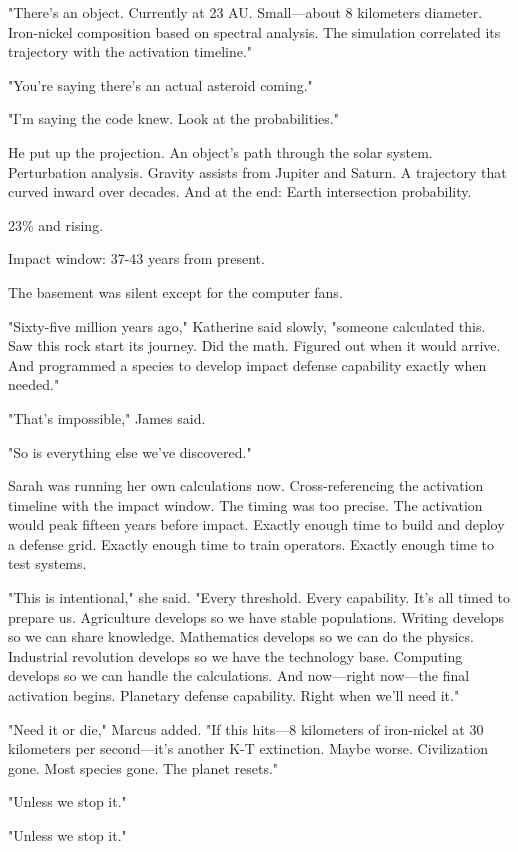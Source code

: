 "There's an object. Currently at 23 AU. Small—about 8 kilometers diameter. Iron-nickel composition based on spectral analysis. The simulation correlated its trajectory with the activation timeline."

"You're saying there's an actual asteroid coming."

"I'm saying the code knew. Look at the probabilities."

He put up the projection. An object's path through the solar system. Perturbation analysis. Gravity assists from Jupiter and Saturn. A trajectory that curved inward over decades. And at the end: Earth intersection probability.

23\% and rising.

Impact window: 37-43 years from present.

The basement was silent except for the computer fans.

"Sixty-five million years ago," Katherine said slowly, "someone calculated this. Saw this rock start its journey. Did the math. Figured out when it would arrive. And programmed a species to develop impact defense capability exactly when needed."

"That's impossible," James said.

"So is everything else we've discovered."

Sarah was running her own calculations now. Cross-referencing the activation timeline with the impact window. The timing was too precise. The activation would peak fifteen years before impact. Exactly enough time to build and deploy a defense grid. Exactly enough time to train operators. Exactly enough time to test systems.

"This is intentional," she said. "Every threshold. Every capability. It's all timed to prepare us. Agriculture develops so we have stable populations. Writing develops so we can share knowledge. Mathematics develops so we can do the physics. Industrial revolution develops so we have the technology base. Computing develops so we can handle the calculations. And now—right now—the final activation begins. Planetary defense capability. Right when we'll need it."

"Need it or die," Marcus added. "If this hits—8 kilometers of iron-nickel at 30 kilometers per second—it's another K-T extinction. Maybe worse. Civilization gone. Most species gone. The planet resets."

"Unless we stop it."

"Unless we stop it."

